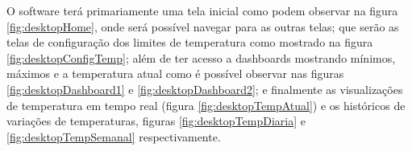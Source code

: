 %
%
%

    O software terá primariamente uma tela inicial 
    como podem observar na figura \ref{fig:desktopHome}, 
    onde será possível navegar para as outras telas;
    que serão as telas de configuração dos limites
    de temperatura como mostrado na 
    figura \ref{fig:desktopConfigTemp};
    além de ter acesso a dashboards mostrando 
    mínimos, máximos e a temperatura atual 
    como é possível observar nas figuras 
    \ref{fig:desktopDashboard1} e \ref{fig:desktopDashboard2};
    e finalmente as visualizações de temperatura em 
    tempo real (figura \ref{fig:desktopTempAtual})
    e os históricos de variações de temperaturas,
    figuras \ref{fig:desktopTempDiaria} e \ref{fig:desktopTempSemanal}
    respectivamente.

